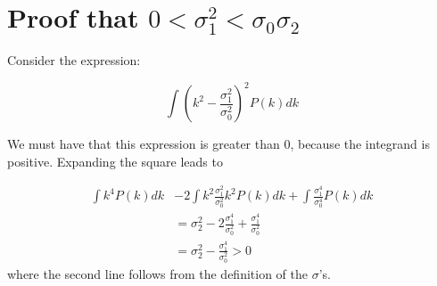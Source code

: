 \documentclass[12pt]{article}
\newcommand{\lfl}[1]{\textcolor{red}{[{\bf LL}: #1]}}
\begin{document}



\section{Proof that $0 < \sigma_1^2 < \sigma_0\sigma_2$} \label{Proof}

Consider the expression:

\begin{equation}
\int (k^2 - \frac{\sigma_1^2}{\sigma_0^2})^2 P(k) dk
\end{equation}

\noindent We must have that this expression is greater than 0, because the integrand is positive. Expanding the square leads to

\begin{equation}
\begin{split}
\int k^4 P(k) dk &- 2 \int k^2 \frac{\sigma_1^2}{\sigma_0^2}k^2 P(k) dk + \int \frac{\sigma_1^4}{\sigma_0^4} P(k) dk \\
&= \sigma_2^2 - 2 \frac{\sigma_1^4}{\sigma_0^2} + \frac{\sigma_1^4}{\sigma_0^2} \\
&= \sigma_2^2 - \frac{\sigma_1^4}{\sigma_0^2} > 0
\end{split}
\end{equation}
where the second line follows from the definition of the $\sigma$'s.
\end{document}

